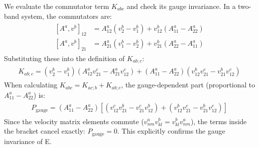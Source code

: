 \documentclass[twocolumn, prx, reprint, amsfonts, amsmath, amssymb, longbibliography, floatfix, aps]{revtex4-2}
\begin{document}
We evaluate the commutator term $K_{abc}$ and check its gauge invariance. In a two-band system, the commutators are:
\begin{align}
\begin{aligned}
[A^a, v^b]_{12} &= A_{12}^a (v_2^b - v_1^b) + v_{12}^b (A_{11}^a - A_{22}^a) \\
[A^a, v^b]_{21} &= A_{21}^a (v_1^b - v_2^b) + v_{21}^b (A_{22}^a - A_{11}^a)
\end{aligned}
\end{align}
Substituting these into the definition of $K_{ab;c}$:
\begin{align}
\begin{aligned}
K_{ab;c} = (v_2^b - v_1^b) (A_{12}^a v_{21}^c - A_{21}^a v_{12}^c) + (A_{11}^a - A_{22}^a) (v_{12}^b v_{21}^c - v_{21}^b v_{12}^c)
\end{aligned}
\end{align}
When calculating $K_{abc} = K_{ac;b} + K_{ab;c}$, the gauge-dependent part (proportional to $A_{11}^a - A_{22}^a$) is:
\begin{align}
\begin{aligned}
P_\text{gauge} = (A_{11}^a - A_{22}^a) [ (v_{12}^c v_{21}^b - v_{21}^c v_{12}^b) + (v_{12}^b v_{21}^c - v_{21}^b v_{12}^c) ]
\end{aligned}
\end{align}
Since the velocity matrix elements commute ($v_{nm}^a v_{kl}^b = v_{kl}^b v_{nm}^a$), the terms inside the bracket cancel exactly: $P_\text{gauge}=0$. This explicitly confirms the gauge invariance of E.
\end{document}
